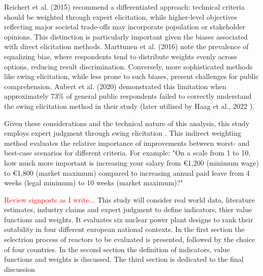 Reichert et al. (2015) \cite{REICHERT2015316} recommend a differentiated approach: technical criteria should be weighted through expert elicitation, while higher-level objectives reflecting major societal trade-offs may incorporate population or stakeholder opinions. This distinction is particularly important given the biases associated with direct elicitation methods. Marttunen et al. (2016) \cite{MARTTUNEN2018178} note the prevalence of equalizing bias, where respondents tend to distribute weights evenly across options, reducing result discrimination. Conversely, more sophisticated methods like swing elicitation, while less prone to such biases, present challenges for public comprehension. Aubert et al. (2020) \cite{AUBERT2020100156} demonstrated this limitation when approximately 73\% of general public respondents failed to correctly understand the swing elicitation method in their study (later utilized by Haag et al., 2022 \cite{HAAG2022105361}).

Given these considerations and the technical nature of this analysis, this study employs expert judgment through swing elicitation \cite{Goodwin_Wright_2004}. This indirect weighting method evaluates the relative importance of improvements between worst- and best-case scenarios for different criteria. For example: "On a scale from 1 to 10, how much more important is increasing your salary from €1,200 (minimum wage) to €1,800 (market maximum) compared to increasing annual paid leave from 4 weeks (legal minimum) to 10 weeks (market maximum)?"


\textcolor{red}{Review signposts as I write...}
This study will consider real world data, literature estimates, industry claims and expert judgment to define indicators, thier value functions and weights. It evaluates six nuclear power plant designs to rank their sutability in four different european national contexts. In the first section the selectrion process of reactors to be evaluated is presented, followed by the choice of four countries. In the second section the definition of indicators, value functions and weights is discussed. The third section is dedicated to the final discussion